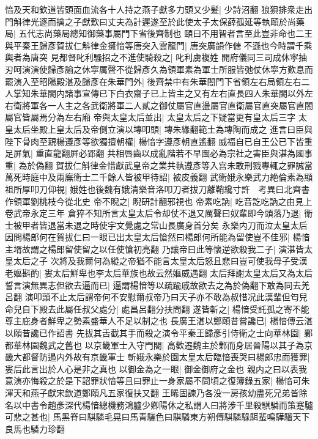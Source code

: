 愔及天和欽道皆頭面血流各十人持之燕子獻多力頭又少髪|{
	少詩沼翻}
狼狽排衆走出門斛律光逐而擒之子獻歎曰丈夫為計遲遂至於此使太子太保薛孤延等執頤於尚藥局|{
	五代志尚藥局總知御藥事屬門下省後齊制也}
頤曰不用智者言至此豈非命也二王與平秦王歸彥賀拔仁斛律金擁愔等唐突入雲龍門|{
	唐突廣韻作傏不遜也今時謂千乘輿者為唐突}
見都督叱利騷招之不進使騎殺之|{
	叱利虜複姓}
開府儀同三司成休寜抽刃呵演演使歸彥諭之休寜厲聲不從歸彥久為領軍素為軍士所服皆弛仗休寜方歎息而罷演入至昭陽殿湛及歸彥在朱華門外|{
	後齊禁中有朱華閤門下省領左右局領左右二人掌知朱華閤内諸事宣傳已下白衣齋子已上皆主之又有左右直長四人朱華閤以外左右衛將軍各一人主之各武衛將軍二人貳之御仗屬官直盪屬官直衛屬官直突屬官直閤屬官皆屬焉分為左右廂}
帝與太皇太后並出|{
	太皇太后之下疑當更有皇太后三字}
太皇太后坐殿上皇太后及帝側立演以塼叩頭|{
	塼朱緣翻範土為塼陶而成之}
進言曰臣與陛下骨肉至親楊遵彥等欲獨擅朝權|{
	楊愔字遵彥朝直遙翻}
威福自已自王公已下皆重足屏氣|{
	重直龍翻屛必郢翻}
共相唇齒以成亂階若不早圖必為宗社之害臣與湛為國事重|{
	為於偽翻}
賀拔仁斛律金惜獻武皇帝之業共執遵彥等入宫未敢刑戮專輒之罪誠當萬死時庭中及兩廡衛士二千餘人皆被甲待詔|{
	被皮義翻}
武衛娥永樂武力絶倫素為顯祖所厚叩刀仰視|{
	娥姓也後魏有娥清樂音洛叩刀者拔刀離鞘纔寸許　考異曰北齊書作領軍劉桃枝今從北史}
帝不睨之|{
	睨研計翻邪視也}
帝素吃訥|{
	吃音訖吃訥之由見上卷武帝永定三年}
倉猝不知所言太皇太后令却仗不退又厲聲曰奴輩即今頭落乃退|{
	衛士被甲者皆退當未退之時使宇文覺處之常山長廣身首分矣}
永樂内刀而泣太皇太后因問楊郎何在賀拔仁曰一眼已出太皇太后愴然曰楊郎何所能為留使豈不佳邪|{
	楊愔主壻故謂之楊郎留使留之以任使愴初亮翻}
乃讓帝曰此等懷逆欲殺我二子|{
	演湛皆太皇太后之子}
次將及我爾何為縱之帝猶不能言太皇太后怒且悲曰豈可使我母子受漢老嫗斟酌|{
	婁太后鮮卑也李太后華族也故云然嫗威遇翻}
太后拜謝太皇太后又為太后誓言演無異志但欲去逼而已|{
	逼謂楊愔等以疏踰戚故欲去之為於偽翻下敢為同去羌呂翻}
演叩頭不止太后謂帝何不安慰爾叔帝乃曰天子亦不敢為叔惜况此漢輩但匄兒命兒自下殿去此屬任叔父處分|{
	處昌呂翻分扶問翻}
遂皆斬之|{
	楊愔受託孤之寄不能尊主庇身者鮮卑之勢素盛華人不足以制之也}
長廣王湛以鄭頤昔嘗讒已|{
	楊愔傳云湛以頤昔讒已作詔書}
先拔其舌截其手而殺之演令平秦王歸彥引侍衛之士向華林園|{
	鄴都華林園魏武之舊也}
以京畿軍士入守門閤|{
	高歡遷魏主於鄴而身居晉陽以其子為京畿大都督防遏内外故有京畿軍士}
斬娥永樂於園太皇太后臨愔喪哭曰楊郎忠而獲罪|{
	婁后此言出於人心是非之真也}
以御金為之一眼|{
	御金御府之金也}
親内之曰以表我意演亦悔殺之於是下詔罪狀愔等且曰罪止一身家屬不問頃之復簿錄五家|{
	楊愔可朱渾天和燕子獻宋欽道鄭頤凡五家復扶又翻}
王晞固諫乃各没一房孩幼盡死兄弟皆除名以中書令趙彥深代楊愔總機務鴻臚少卿陽休之私謂人曰將涉千里殺騏驎而策蹇驢可悲之甚也|{
	馬黑脊曰騏驎毛晃曰馬青驪色曰騏驎東方朔傳騏驎騄駬蜚鳴驊騮天下良馬也驎力珍翻}
